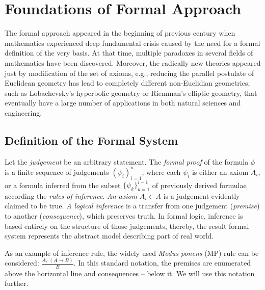 \documentclass[article]{aaltoseries}
\begin{document}


\section{Foundations of Formal Approach}
\label{sec:formal_theory}

The formal approach appeared in the beginning of previous century when mathematics experienced deep fundamental crisis caused by the need for a formal definition of the very basis. At that time, multiple paradoxes in several fields of mathematics have been discovered. Moreover, the radically new theories appeared just by modification of the set of axioms, e.g., reducing the parallel postulate of Euclidean geometry has lead to completely different non-Euclidian geometries, such as Lobachevsky's hyperbolic geometry or Riemman's elliptic geometry, that eventually have a large number of applications in both natural sciences and engineering.


\subsection{Definition of the Formal System}
\label{sec:definitions}


Let the \textit{judgement} be an arbitrary statement. The \textit{formal proof} of the formula $\phi$ is a finite sequence of judgements $ ( \psi_i )_{i=1}^{n} $, where each $\psi_i$ is either an axiom $A_i$, or a formula inferred from the subset $\{ \psi_k \}_{k=1}^{i-1}$ of previously derived formulae according the \textit{rules of inference}. \textit{An axiom} $A_i \in A$ is a judgement evidently claimed to be true. \textit{A logical inference} is a transfer from one judgement (\textit{premise}) to another (\textit{consequence}), which preserves truth. In formal logic, inference is based entirely on the structure of those judgements, thereby, the result formal system represents the abstract model describing part of real world. 

As an example of inference rule, the widely used \textit{Modus ponens} (MP) rule can be considered: ${ {\frac {A,\ (A\rightarrow B)}{B}}}$. In this standard notation, the premises are enumerated above the horizontal line and consequences -- below it. We will use this notation further. 
\end{document}
